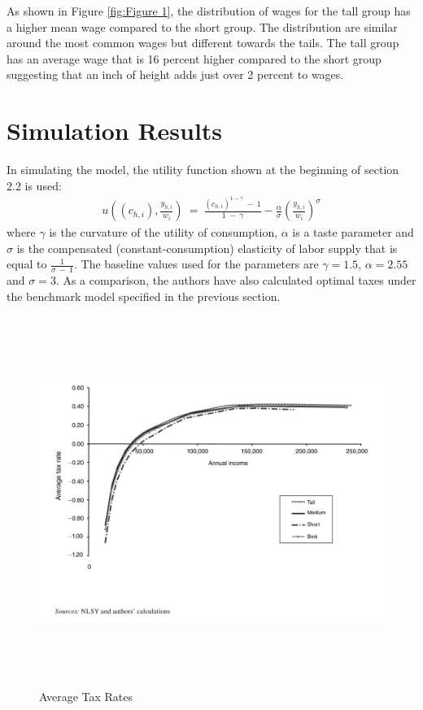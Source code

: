\documentclass[titlepage]{\econtex}
\begin{document}
  As shown in Figure \ref{fig:Figure 1}, the distribution of wages for the tall group has a higher mean wage compared to the short group. The distribution are similar around the most common wages but different towards the tails. The tall group has an average wage that is 16 percent higher compared to the short group suggesting that an inch of height adds just over 2 percent to wages.

\hypertarget{Simulation Results}{}
\section{Simulation Results}

In simulating the model, the utility function shown at the beginning of section 2.2 is used:
   \begin{align}
  u\left((c_{h,i}), \frac{y_{h,i}}{w_i}\right) \ = \ \frac{(c_{h,i})^{1-\gamma} \ - \ 1}{1 \ - \ \gamma} - \frac{\alpha}{\sigma} \left(\frac{y_{h,i}}{w_i}\right)^\sigma
   \end{align}
   where $\gamma$ is the curvature of the utility of consumption, $\alpha$ is a taste parameter and $\sigma$ is the compensated (constant-consumption) elasticity of labor supply that is equal to $\frac{1}{\sigma \ - \ 1}$. The baseline values used for the parameters are $\gamma = 1.5$, $\alpha = 2.55$ and $ \sigma = 3$. As a comparison, the authors have also calculated optimal taxes under the benchmark model specified in the previous section.

\begin{figure}[H]
  \centering
  \includegraphics[width=1\textwidth, height=12cm]{AverageTax.JPG}
  \caption{Average Tax Rates}
    \label{fig:Figure 2}
  \end{figure}
   
\end{document}
